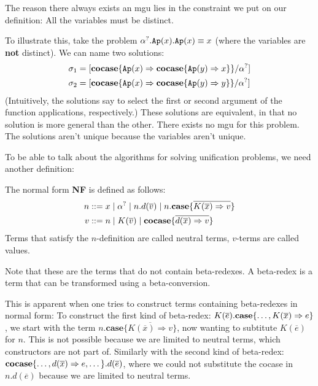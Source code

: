\documentclass[twoside,12pt,a4paper]{article}
\begin{document}
The reason there always exists an mgu lies in the constraint we put on our definition: All the variables must be distinct. 

To illustrate this, take the problem $\alpha^?.\texttt{Ap}(x).\texttt{Ap}(x)\equiv x$ (where the variables are \textbf{not} distinct). 
We can name two solutions:
\begin{align*}
    \sigma_1 &= [\textbf{cocase}\{\texttt{Ap}(x)\Rightarrow \textbf{cocase}\{\texttt{Ap}(y)\Rightarrow x\}\}/\alpha^?]\\
    \sigma_2 &=[\textbf{cocase}\{\texttt{Ap}(x)\Rightarrow \textbf{cocase}\{\texttt{Ap}(y)\Rightarrow y\}\}/\alpha^?]  
\end{align*}
(Intuitively, the solutions say to select the first or second argument of the function applications, respectively.)
These solutions are equivalent, in that no solution is more general than the other. There exists no mgu for this problem.
The solutions aren't unique because the variables aren't unique.

To be able to talk about the algorithms for solving unification problems, we need another definition: %
\begin{definition}
    The normal form \textbf{NF} is defined as follows:
    \begin{align*}
        n &::= x \;|\; \alpha^? \;|\; n.d(\overline{v})\;|\; n.\textbf{case}\{\overline{K(\overline{x})\Rightarrow v}\}\\
        v &::= n \;|\; K(\overline{v}) \;|\; \textbf{cocase}\{\overline{d(\overline{x})\Rightarrow v}\}
    \end{align*}
    Terms that satisfy the $n$-definition are called neutral terms, $v$-terms are called values.
\end{definition}
Note that these are the terms that do not contain beta-redexes. 
A beta-redex is a term that can be transformed using a beta-conversion.

This is apparent when one tries to construct terms containing beta-redexes in normal form: 
To construct the first kind of beta-redex: $K(\overline{e}).\textbf{case}\{\dots,K(\overline{x})\Rightarrow e\}$,
we start with the term $n.\textbf{case}\{\overline{K(\overline{x})\Rightarrow v}\}$, now wanting to subtitute $K(\overline{e})$ for $n$. 
This is not possible because we are limited to neutral terms, which constructors are not part of.
Similarly with the second kind of beta-redex:
$\textbf{cocase}\{\dots,d(\overline{x}) \Rightarrow e, \dots\}.d(\overline{e})$, where we could not substitute the cocase in $n.d(\overline{e})$ because we are limited to neutral terms.
        
\end{document}
